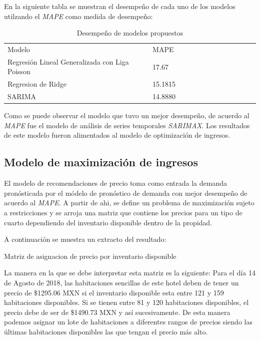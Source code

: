 En la siguiente tabla se muestran el desempeño de cada uno de los modelos utilzando el \emph{MAPE} como medida de desempeño:

\begin{table}[H]
\begin{tabular}{lllllllllllll}
Modelo  & MAPE      \\
Regresión Lineal Generalizada con Liga Poisson & 17.67 \\
Regresion de Ridge & 15.1815 \\
SARIMA & 14.8880
\end{tabular}
\caption{Desempeño de modelos propuestos} 
\end{table}

Como se puede observar el modelo que tuvo un mejor desempeño, de acuerdo al \emph{MAPE} fue el modelo de análisis de series temporales \emph{SARIMAX}. Los resultados de este modelo fueron alimentados al modelo de optimización de ingresos.

\subsection*{Modelo de maximización de ingresos}

El modelo de recomendaciones de precio toma como entrada la demanda pronósticada por el módelo de pronóstico de demanda con mejor desempeño de acuerdo al \emph{MAPE}. A partir de ahi, se define un problema de maximización sujeto a restricciones y se arroja una matriz que contiene los precios para un tipo de cuarto dependiendo del inventario disponible dentro de la propidad.

A continuación se muestra un extracto del resultado:

\begin{table}[H]
  \centering
  \par
  \caption{Matriz de asignacion de precio por inventario disponible}
\end{table}

La manera en la que se debe interpretar esta matriz es la siguiente: Para el día 14 de Agosto de 2018, las habitaciones sencillas de este hotel deben de tener un precio de \$1295.06 MXN si el inventario disponible esta entre 121 y 159 habitaciones disponibles. Si se tienen entre 81 y 120 habitaciones disponibles, el precio debe de ser de \$1490.73 MXN y así sucesivamente. De esta manera podemos asignar un lote de habitaciones a diferentes rangos de precios siendo las últimas habitaciones disponibles las que tengan el precio más alto.


